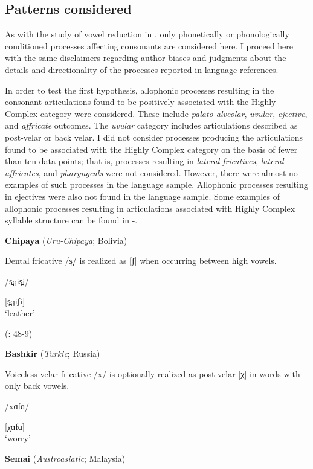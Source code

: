 \subsection{Patterns considered}\label{sec:7.2.1}

  As with the study of vowel reduction in , only phonetically or phonologically conditioned processes affecting consonants are considered here. I proceed here with the same disclaimers regarding author biases and judgments about the details and directionality of the processes reported in language references.

  In order to test the first hypothesis, allophonic processes resulting in the consonant articulations found to be positively associated with the Highly Complex category were considered. These include \textit{palato-alveolar}, \textit{uvular}, \textit{ejective}, and \textit{affricate} outcomes. The \textit{uvular} category includes articulations described as post-velar or back velar. I did not consider processes producing the articulations found to be associated with the Highly Complex category on the basis of fewer than ten data points; that is, processes resulting in \textit{lateral fricatives}, \textit{lateral affricates}, and \textit{pharyngeals} were not considered. However, there were almost no examples of such processes in the language sample. Allophonic processes resulting in ejectives were also not found in the language sample. Some examples of allophonic processes resulting in articulations associated with Highly Complex syllable structure can be found in -.

\ea\label{ex:7.3}
  \textbf{Chipaya} (\textit{Uru-Chipaya}; Bolivia)

Dental fricative /s̪/ is realized as [ʃ] when occurring between high vowels.

/s̪qis̪i/

[s̪qiʃi]\\
\glt ‘leather’

(\citealt{Cerrón-Palomino2006}: 48-9)
\z

\ea\label{ex:7.4}
  \textbf{Bashkir} (\textit{Turkic}; Russia)

Voiceless velar fricative /x/ is optionally realized as post-velar [χ] in words with only back vowels.

/xɑfɑ/

[χɑfɑ]\\
\glt ‘worry’
\citep[11]{Poppe1964}
\z

\ea\label{ex:7.5}
  \textbf{Semai} (\textit{Austroasiatic}; Malaysia)

